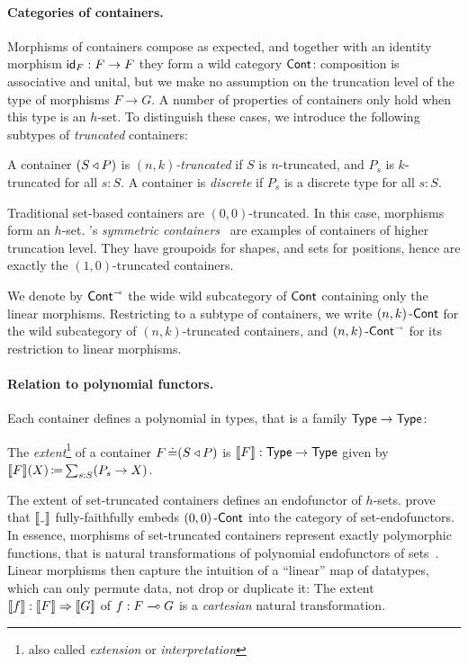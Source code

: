 \paragraph{Categories of containers.}
Morphisms of containers compose as expected, and together with an identity morphism \( \operatorname{\mathsf{id}}_F : F \to F \)
they form a wild category \( \operatorname{\mathsf{Cont}} \):
composition is associative and unital, but we make no assumption on the truncation level of the type of morphisms \( F \to G \).
A number of properties of containers only hold when this type is an \( h \)-set.
To distinguish these cases, we introduce the following subtypes of \emph{truncated} containers:
\begin{definition}
  A container \( (S\mathbin{\triangleleft}P) \) is \emph{\( (n,k) \)-truncated} if \( S \) is \( n \)-truncated,
  and \( P_s \) is \( k \)-truncated for all \( s : S \).
  A container is \emph{discrete} if \( P_s \) is a discrete type for all \( s : S \).
\end{definition}
Traditional set-based containers are \( (0,0) \)-truncated.
In this case, morphisms form an \( h \)-set.
's \emph{symmetric containers}~\cite{Gylterud2011} are examples of containers of higher truncation level.
They have groupoids for shapes, and sets for positions, hence are exactly the \( (1,0) \)-truncated containers.

We denote by \( \operatorname{\operatorname{\mathsf{Cont}}}^{{\scriptscriptstyle\multimap}} \) the wide wild subcategory of \( \operatorname{\mathsf{Cont}} \) containing only the linear morphisms.
Restricting to a subtype of containers,
we write \( (n,k)\operatorname{\mathsf{-Cont}} \) for the wild subcategory of \( (n,k) \)-truncated containers,
and \( (n,k)\operatorname{\mathsf{-Cont}}^{{\scriptscriptstyle\multimap}} \) for its restriction to linear morphisms.

\paragraph{Relation to polynomial functors.}
Each container defines a polynomial in types, that is a family \( \operatorname{\mathsf{Type}} \to \operatorname{\mathsf{Type}} \):
\begin{definition}\label{wild-extension}
  The \emph{extent}\footnote{also called \emph{extension} or \emph{interpretation}} of a container \( F \operatorname{\mathrel{\doteq}} (S\mathbin{\triangleleft}P) \) is \( \llbracket F\rrbracket : \operatorname{\mathsf{Type}} \to \operatorname{\mathsf{Type}} \)
  given by \( \llbracket F\rrbracket(X) \operatorname{\mathrel{\coloneq}} \sum_{s : S} (P_s \to X) \).
\end{definition}
The extent of set-truncated containers defines an endofunctor of \( h \)-sets.
 prove that
\( \Ext{\Blank} \) fully-faithfully embeds \( (0,0)\operatorname{\mathsf{-Cont}} \) into the category of set-endofunctors.
In essence, morphisms of set-truncated containers represent exactly polymorphic functions,
that is natural transformations of polynomial endofunctors of sets~\cite[{Theorem~3.4}]{AbbottEtAl2005ContainersConstructingstrictly}.
Linear morphisms then capture the intuition of a \enquote{linear} map of datatypes,
which can only permute data, not drop or duplicate it:
The extent \( \llbracket f\rrbracket : \llbracket F\rrbracket \Rightarrow \llbracket G\rrbracket \) of \(f : F\mathrel{\multimap}G \) is a \emph{cartesian} natural transformation.

